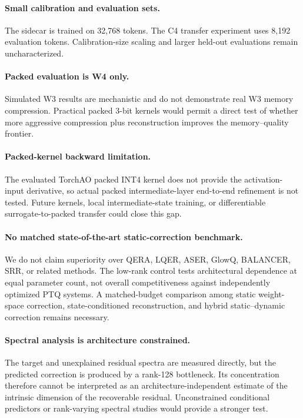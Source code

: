 \documentclass[11pt]{article}
\begin{document}
\paragraph{Small calibration and evaluation sets.}
The sidecar is trained on 32,768 tokens. The C4 transfer experiment uses 8,192 evaluation tokens. Calibration-size scaling and larger held-out evaluations remain uncharacterized.

\paragraph{Packed evaluation is W4 only.}
Simulated W3 results are mechanistic and do not demonstrate real W3 memory compression. Practical packed 3-bit kernels would permit a direct test of whether more aggressive compression plus reconstruction improves the memory--quality frontier.

\paragraph{Packed-kernel backward limitation.}
The evaluated TorchAO packed INT4 kernel does not provide the activation-input derivative, so actual packed intermediate-layer end-to-end refinement is not tested. Future kernels, local intermediate-state training, or differentiable surrogate-to-packed transfer could close this gap.

\paragraph{No matched state-of-the-art static-correction benchmark.}
We do not claim superiority over QERA, LQER, ASER, GlowQ, BALANCER, SRR, or related methods. The low-rank control tests architectural dependence at equal parameter count, not overall competitiveness against independently optimized PTQ systems. A matched-budget comparison among static weight-space correction, state-conditioned reconstruction, and hybrid static--dynamic correction remains necessary.

\paragraph{Spectral analysis is architecture constrained.}
The target and unexplained residual spectra are measured directly, but the predicted correction is produced by a rank-128 bottleneck. Its concentration therefore cannot be interpreted as an architecture-independent estimate of the intrinsic dimension of the recoverable residual. Unconstrained conditional predictors or rank-varying spectral studies would provide a stronger test.
\end{document}
